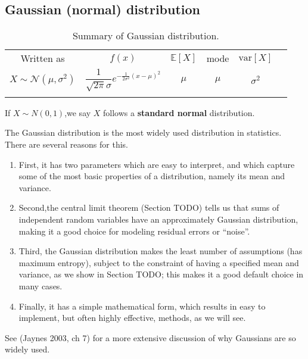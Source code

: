 \subsection{Gaussian (normal) distribution}


\begin{table}
\caption{Summary of Gaussian distribution.}
\centering
\begin{tabular}{cccccc}
\hline\noalign{\smallskip}
Written as & $f(x)$ & $\mathbb{E}[X]$ & mode & $\text{var}[X]$ \\
\noalign{\smallskip}\svhline\noalign{\smallskip}
$X \sim \mathcal{N}(\mu,\sigma^2)$ & $\dfrac{1}{\sqrt{2\pi}\sigma}e^{-\frac{1}{2\sigma^2}\left(x-\mu\right)^2}$ & $\mu$ & $\mu$ & $\sigma^2$ \\
\noalign{\smallskip}\hline
\end{tabular}
\end{table} 

If $X \sim N(0,1)$,we say $X$ follows a \textbf{standard normal} distribution.

The Gaussian distribution is the most widely used distribution in statistics. There are several reasons for this. 
\begin{enumerate}
\item First, it has two parameters which are easy to interpret, and which capture some of the most basic properties of a distribution, namely its mean and variance. 
\item Second,the central limit theorem (Section TODO) tells us that sums of independent random variables have an approximately Gaussian distribution, making it a good choice for modeling residual errors or “noise”. 
\item Third, the Gaussian distribution makes the least number of assumptions (has maximum entropy), subject to the constraint of having a specified mean and variance, as we show in Section TODO; this makes it a good default choice in many cases. 
\item Finally, it has a simple mathematical form, which results in easy to implement, but often highly effective, methods, as we will see. 
\end{enumerate}
See (Jaynes 2003, ch 7) for a more extensive discussion of why Gaussians are so widely used.


